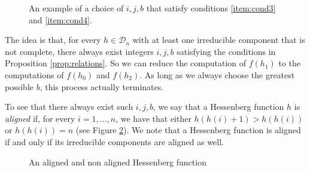 \documentclass[10pt]{amsart}
\theoremstyle{definition}
\newcommand{\D}{\mathcal{D}}
\newcommand{\dyckpath}[2]{
\draw[line width=2pt] (#1) foreach \dir in {#2}{ -- ++(\dir*90:1)};
}
\newcommand{\dyckpathc}[3]{
\draw[line width=2pt, color=#3] (#1) foreach \dir in {#2}{ -- ++(\dir*90:1)};
}
\newcommand{\gline}[4]{
\draw[line width=#4 pt, color=#3] (#1) -- (#2);
}
\begin{document}
\begin{figure}[htb]  \centering
{}
\caption{An example of a choice of $i,j,b$ that satisfy conditions \eqref{item:cond3} and \eqref{item:cond4}.}
\label{fig:sat34}
\end{figure}





The idea is that, for every $h\in \D_n$ with at least one irreducible component that is not complete, there always exist integers $i,j,b$ satisfying the conditions in Proposition \ref{prop:relations}. So we can reduce the computation of $f(h_1)$ to the computations of $f(h_0)$ and $f(h_2)$. As long as we always choose the greatest possible $b$, this process actually terminates.\par
  To see that there always exist such $i,j,b$, we say that a Hessenberg function $h$ is \emph{aligned} if, for every $i=1,\ldots, n$, we have that either $h(h(i)+1)>h(h(i))$ or $h(h(i))=n$ (see Figure \ref{fig:ali}). We note that a Hessenberg function is aligned if and only if its irreducible components are aligned as well.
\begin{figure}[htb]  \centering
{}
\caption{An aligned and non aligned Hessenberg function}
\label{fig:ali}
\end{figure}
\end{document}
